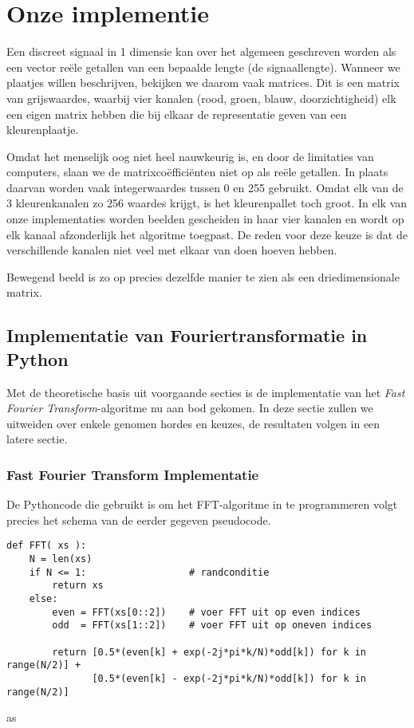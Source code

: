\chapter{Onze implementie}

Een discreet signaal in 1 dimensie kan over het algemeen geschreven worden als een vector re\"ele getallen van een bepaalde lengte (de signaallengte). Wanneer we plaatjes willen beschrijven, bekijken we daarom vaak matrices. Dit is een matrix van grijswaardes, waarbij vier kanalen (rood, groen, blauw, doorzichtigheid) elk een eigen matrix hebben die bij elkaar de representatie geven van een kleurenplaatje.

Omdat het menselijk oog niet heel nauwkeurig is, en door de limitaties van computers, slaan we de matrixco\"effici\"enten niet op als re\"ele getallen. In plaats daarvan worden vaak integerwaardes tussen 0 en 255 gebruikt. Omdat elk van de 3 kleurenkanalen zo 256 waardes krijgt, is het kleurenpallet toch groot. In elk van onze implementaties worden beelden gescheiden in haar vier kanalen en wordt op elk kanaal afzonderlijk het algoritme toegpast. De reden voor deze keuze is dat de verschillende kanalen niet veel met elkaar van doen hoeven hebben.

Bewegend beeld is zo op precies dezelfde manier te zien als een driedimensionale matrix.

\section{Implementatie van Fouriertransformatie in Python}
Met de theoretische basis uit voorgaande secties is de implementatie van het \emph{Fast Fourier Transform}-algoritme
nu aan bod gekomen. In deze sectie zullen we uitweiden over enkele genomen hordes en keuzes, de resultaten volgen
in een latere sectie.

\subsection{Fast Fourier Transform Implementatie}
De Pythoncode die gebruikt is om het FFT-algoritme in te programmeren volgt precies het schema van de eerder gegeven pseudocode.

\begin{lstlisting}[caption={FFT algoritme in Python, voert de pseudocode uit zoals in sectie~\ref{fft_sec}}]
def FFT( xs ):
    N = len(xs)
    if N <= 1:                  # randconditie
        return xs
    else:
        even = FFT(xs[0::2])    # voer FFT uit op even indices
        odd  = FFT(xs[1::2])    # voer FFT uit op oneven indices

        return [0.5*(even[k] + exp(-2j*pi*k/N)*odd[k]) for k in range(N/2)] + 
               [0.5*(even[k] - exp(-2j*pi*k/N)*odd[k]) for k in range(N/2)]
\end{lstlisting}as


